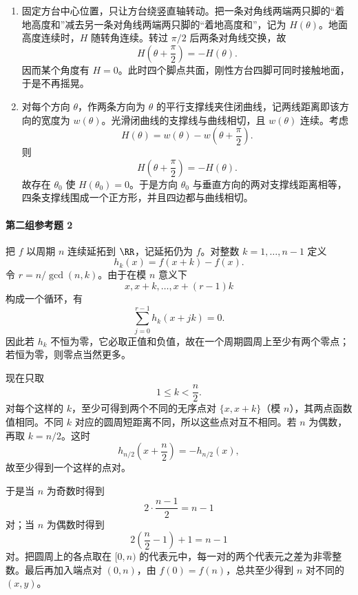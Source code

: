 \begin{xsolution}
\begin{enumerate}[label=(\arabic*)]
 \item 固定方台中心位置，只让方台绕竖直轴转动。把一条对角线两端两只脚的“着地高度和”减去另一条对角线两端两只脚的“着地高度和”，记为 $H(\theta)$。地面高度连续时，$H$ 随转角连续。转过 $\pi/2$ 后两条对角线交换，故
 \[
  H\left(\theta+\frac\pi2\right)=-H(\theta).
 \]
 因而某个角度有 $H=0$。此时四个脚点共面，刚性方台四脚可同时接触地面，于是不再摇晃。

 \item 对每个方向 $\theta$，作两条方向为 $\theta$ 的平行支撑线夹住闭曲线，记两线距离即该方向的宽度为 $w(\theta)$。光滑闭曲线的支撑线与曲线相切，且 $w(\theta)$ 连续。考虑
 \[
  H(\theta)=w(\theta)-w\left(\theta+\frac\pi2\right).
 \]
 则
 \[
  H\left(\theta+\frac\pi2\right)
  =-H(\theta).
 \]
 故存在 $\theta_0$ 使 $H(\theta_0)=0$。于是方向 $\theta_0$ 与垂直方向的两对支撑线距离相等，四条支撑线围成一个正方形，并且四边都与曲线相切。
\end{enumerate}
\end{xsolution}

\paragraph{第二组参考题 2}
\begin{xsolution}
把 $f$ 以周期 $n$ 连续延拓到 $\RR$，记延拓仍为 $f$。对整数 $k=1,\ldots,n-1$ 定义
\[
 h_k(x)=f(x+k)-f(x).
\]
令 $r=n/\gcd(n,k)$。由于在模 $n$ 意义下
\[
 x,x+k,\ldots,x+(r-1)k
\]
构成一个循环，有
\[
 \sum_{j=0}^{r-1}h_k(x+jk)=0.
\]
因此若 $h_k$ 不恒为零，它必取正值和负值，故在一个周期圆周上至少有两个零点；若恒为零，则零点当然更多。

现在只取
\[
 1\le k<\frac n2.
\]
对每个这样的 $k$，至少可得到两个不同的无序点对 $\{x,x+k\}$（模 $n$），其两点函数值相同。不同 $k$ 对应的圆周短距离不同，所以这些点对互不相同。若 $n$ 为偶数，再取 $k=n/2$。这时
\[
 h_{n/2}\left(x+\frac n2\right)=-h_{n/2}(x),
\]
故至少得到一个这样的点对。

于是当 $n$ 为奇数时得到
\[
 2\cdot\frac{n-1}{2}=n-1
\]
对；当 $n$ 为偶数时得到
\[
 2\left(\frac n2-1\right)+1=n-1
\]
对。把圆周上的各点取在 $[0,n)$ 的代表元中，每一对的两个代表元之差为非零整数。最后再加入端点对 $(0,n)$，由 $f(0)=f(n)$，总共至少得到 $n$ 对不同的 $(x,y)$。
\end{xsolution}

